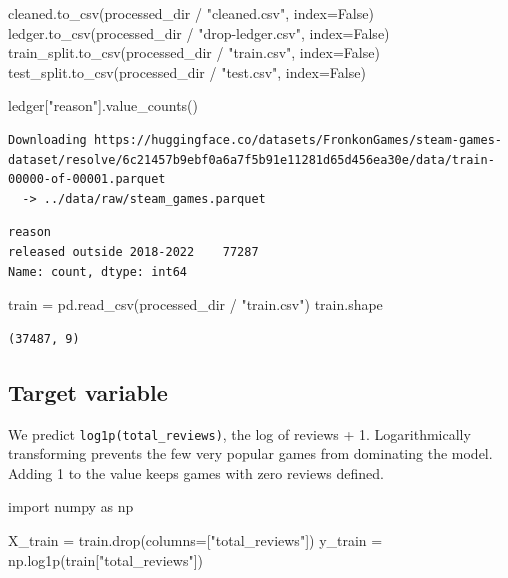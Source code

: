 \documentclass[
  letterpaper,
  DIV=11,
  numbers=noendperiod]{scrartcl}
\newenvironment{Shaded}{\begin{snugshade}}{\end{snugshade}}
\newcommand{\ImportTok}[1]{\textcolor[rgb]{0.00,0.46,0.62}{#1}}
\newcommand{\NormalTok}[1]{\textcolor[rgb]{0.00,0.23,0.31}{#1}}
\newcommand{\OperatorTok}[1]{\textcolor[rgb]{0.37,0.37,0.37}{#1}}
\newcommand{\StringTok}[1]{\textcolor[rgb]{0.13,0.47,0.30}{#1}}
\newcommand{\VariableTok}[1]{\textcolor[rgb]{0.07,0.07,0.07}{#1}}
\begin{document}
\begin{Shaded}
\begin{Highlighting}[]
\NormalTok{cleaned.to\_csv(processed\_dir }\OperatorTok{/} \StringTok{"cleaned.csv"}\NormalTok{, index}\OperatorTok{=}\VariableTok{False}\NormalTok{)}
\NormalTok{ledger.to\_csv(processed\_dir }\OperatorTok{/} \StringTok{"drop{-}ledger.csv"}\NormalTok{, index}\OperatorTok{=}\VariableTok{False}\NormalTok{)}
\NormalTok{train\_split.to\_csv(processed\_dir }\OperatorTok{/} \StringTok{"train.csv"}\NormalTok{, index}\OperatorTok{=}\VariableTok{False}\NormalTok{)}
\NormalTok{test\_split.to\_csv(processed\_dir }\OperatorTok{/} \StringTok{"test.csv"}\NormalTok{, index}\OperatorTok{=}\VariableTok{False}\NormalTok{)}

\NormalTok{ledger[}\StringTok{"reason"}\NormalTok{].value\_counts()}
\end{Highlighting}
\end{Shaded}

\begin{verbatim}
Downloading https://huggingface.co/datasets/FronkonGames/steam-games-dataset/resolve/6c21457b9ebf0a6a7f5b91e11281d65d456ea30e/data/train-00000-of-00001.parquet
  -> ../data/raw/steam_games.parquet
\end{verbatim}

\begin{verbatim}
reason
released outside 2018-2022    77287
Name: count, dtype: int64
\end{verbatim}

\begin{Shaded}
\begin{Highlighting}[]
\NormalTok{train }\OperatorTok{=}\NormalTok{ pd.read\_csv(processed\_dir }\OperatorTok{/} \StringTok{"train.csv"}\NormalTok{)}
\NormalTok{train.shape}
\end{Highlighting}
\end{Shaded}

\begin{verbatim}
(37487, 9)
\end{verbatim}

\subsection{Target variable}\label{target-variable}

We predict \texttt{log1p(total\_reviews)}, the log of reviews + 1.
Logarithmically transforming prevents the few very popular games from
dominating the model. Adding 1 to the value keeps games with zero
reviews defined.

\begin{Shaded}
\begin{Highlighting}[]
\ImportTok{import}\NormalTok{ numpy }\ImportTok{as}\NormalTok{ np}

\NormalTok{X\_train }\OperatorTok{=}\NormalTok{ train.drop(columns}\OperatorTok{=}\NormalTok{[}\StringTok{"total\_reviews"}\NormalTok{])}
\NormalTok{y\_train }\OperatorTok{=}\NormalTok{ np.log1p(train[}\StringTok{"total\_reviews"}\NormalTok{])}
\end{Highlighting}
\end{Shaded}
\end{document}
